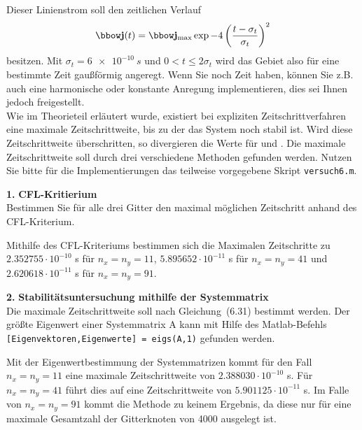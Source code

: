 \documentclass[Protokollheft.tex]{subfiles}
\begin{document}
\noindent Dieser Linienstrom soll den zeitlichen Verlauf
\begin{align}
    \jfit(t) = \jfit_{\text{max}} \exp{-4\left(\frac{t-\sigma_t}{\sigma_t}\right)^2}
\end{align}
besitzen. Mit $\sigma_t=\SI{6e-10}{s}$ und $0 < t\leq 2 \sigma_t$ wird das Gebiet also für eine bestimmte Zeit gaußförmig angeregt. Wenn Sie noch Zeit haben, können Sie z.B. auch eine harmonische oder konstante Anregung implementieren, dies sei Ihnen jedoch freigestellt.\\
\noindent
Wie im Theorieteil erläutert wurde, existiert bei expliziten Zeitschrittverfahren eine maximale Zeitschrittweite, bis zu
der das System noch stabil ist. Wird diese Zeitschrittweite
überschritten, so divergieren die Werte für {\efit} und {\hfit}. Die maximale
Zeitschrittweite soll durch drei verschiedene Methoden gefunden werden. Nutzen Sie bitte für die Implementierungen das teilweise vorgegebene Skript \lstinline{versuch6.m}.

\begin{framed}
	\noindent \textbf{1.} \textbf{CFL-Kritierium}\\
Bestimmen Sie für alle drei Gitter den maximal möglichen Zeitschritt anhand des CFL-Kriterium.\label{exer:calcDeltaTmaxWithCFL}
\end{framed}
\noindent
Mithilfe des CFL-Kriteriums bestimmen sich die Maximalen Zeitschritte zu $2.352755\cdot 10^{-10}$ s für $n_x = n_y = 11$, $5.895652 \cdot 10^{-11}$ s für $n_x = n_y = 41$ und $2.620618 \cdot 10^{-11}$ s für $n_x = n_y = 91$.
\begin{framed}
	\noindent \textbf{2.} \textbf{Stabilitätsuntersuchung mithilfe der Systemmatrix}\\
Die maximale Zeitschrittweite soll nach Gleichung~(6.31) bestimmt werden.
Der größte Eigenwert einer Systemmatrix A kann mit Hilfe
des Matlab-Befehls\\
\lstinline{[Eigenvektoren,Eigenwerte] = eigs(A,1)} gefunden werden.\label{exer:calcDeltaTmaxWithEV}
\end{framed}
\noindent
Mit der Eigenwertbestimmung der Systemmatrizen kommt für den Fall $n_x=n_y =11$ eine maximale Zeitschrittweite von $2.388030 \cdot 10^{-10}$ s. Für $n_x=n_y=41$ führt dies auf eine Zeitschrittweite von $5.901125\cdot 10^{-11} $ s. Im Falle von $n_x=n_y=91$ kommt die Methode zu keinem Ergebnis, da diese nur für eine maximale Gesamtzahl der Gitterknoten von 4000 ausgelegt ist.
\end{document}

